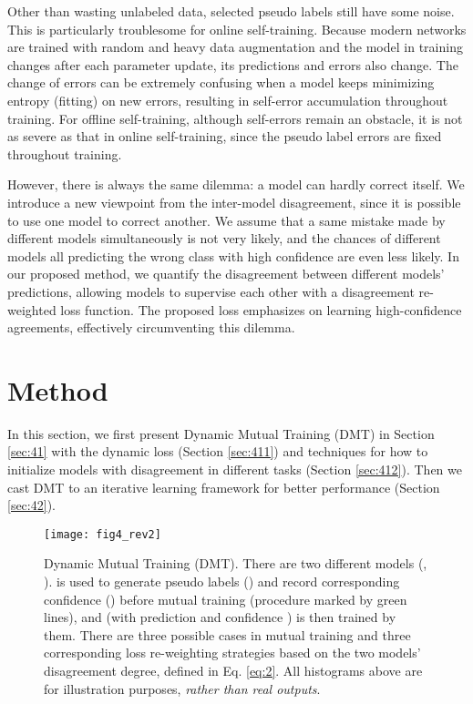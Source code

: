 \documentclass[preprint,review,10pt]{elsarticle}
\begin{document}
Other than wasting unlabeled data, selected pseudo labels still have some noise. This is particularly troublesome for online self-training. Because modern networks are trained with random and heavy data augmentation and the model in training changes after each parameter update, its predictions and errors also change. The change of errors can be extremely confusing when a model keeps minimizing entropy (fitting) on new errors, resulting in self-error accumulation throughout training. For offline self-training, although self-errors remain an obstacle, it is not as severe as that in online self-training, since the pseudo label errors are fixed throughout training.

However, there is always the same dilemma: a model can hardly correct itself. We introduce a new viewpoint from the inter-model disagreement, since it is possible to use one model to correct another. We assume that a same mistake made by different models simultaneously is not very likely, and the chances of different models all predicting the wrong class with high confidence are even less likely. In our proposed method, we quantify the disagreement between different models' predictions, allowing models to supervise each other with a disagreement re-weighted loss function. The proposed loss emphasizes on learning high-confidence agreements, effectively circumventing this dilemma.





\section{Method}
\label{sec:4}

In this section, we first present Dynamic Mutual Training (DMT) in Section \ref{sec:41} with the dynamic loss (Section \ref{sec:411}) and techniques for how to initialize models with disagreement in different tasks (Section \ref{sec:412}). Then we cast DMT to an iterative learning framework for better performance (Section \ref{sec:42}).

\begin{figure}[t]
\centering
\texttt{[image: fig4\_rev2]}
\caption{Dynamic Mutual Training (DMT). There are two  different models (, ).  is used to generate pseudo labels () and record corresponding confidence () before mutual training (procedure marked by green lines), and  (with prediction  and confidence ) is then trained by them. There are three possible cases in mutual training and three corresponding loss re-weighting strategies based on the two models' disagreement degree, defined in Eq. \ref{eq:2}. All histograms above are for illustration purposes, \textit{rather than real outputs}. }
\label{fig4}
\end{figure}
\end{document}
